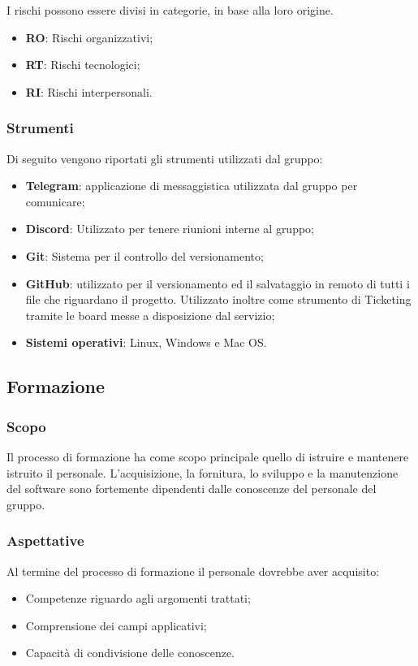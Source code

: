 				I rischi possono essere divisi in categorie, in base alla loro origine.
				\begin{itemize}
					\item \textbf{RO}: Rischi organizzativi;
					\item \textbf{RT}: Rischi tecnologici;
					\item \textbf{RI}: Rischi interpersonali.	
				\end{itemize}
			
		\subsubsection{Strumenti}
		Di seguito vengono riportati gli strumenti utilizzati dal gruppo:
		\begin{itemize}
			\item \textbf{Telegram}: applicazione di messaggistica utilizzata dal gruppo per comunicare;
			\item \textbf{Discord}: Utilizzato per tenere riunioni interne al gruppo;
			\item \textbf{Git}: Sistema per il controllo del versionamento;
			\item \textbf{GitHub}: utilizzato per il versionamento ed il salvataggio in remoto di tutti i file che riguardano il progetto. Utilizzato inoltre come strumento di Ticketing tramite le board messe a disposizione dal servizio;
			\item \textbf{Sistemi operativi}: Linux, Windows e Mac OS.
		\end{itemize}
		
		
		\subsection{Formazione}
			\subsubsection{Scopo}
			Il processo di formazione ha come scopo principale quello di istruire e mantenere istruito il personale. L'acquisizione, la fornitura, lo sviluppo e la manutenzione del software sono fortemente dipendenti dalle conoscenze del personale del gruppo.
			
			\subsubsection{Aspettative}
			Al termine del processo di formazione il personale dovrebbe aver acquisito:
			\begin{itemize}
				\item Competenze riguardo agli argomenti trattati;
				\item Comprensione dei campi applicativi; 
				\item Capacità di condivisione delle conoscenze.
			\end{itemize}
			
